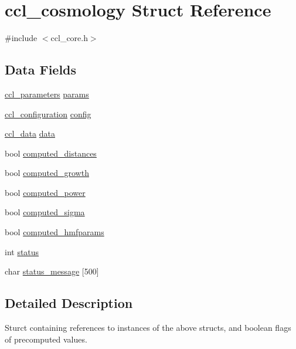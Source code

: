 \hypertarget{structccl__cosmology}{}\section{ccl\+\_\+cosmology Struct Reference}
\label{structccl__cosmology}


{\ttfamily \#include $<$ccl\+\_\+core.\+h$>$}

\subsection*{Data Fields}
\begin{DoxyCompactItemize}
\item 
\mbox{\hyperlink{structccl__parameters}{ccl\+\_\+parameters}} \mbox{\hyperlink{structccl__cosmology_ad58413720be45a206716254d9c1cc923}{params}}
\item 
\mbox{\hyperlink{structccl__configuration}{ccl\+\_\+configuration}} \mbox{\hyperlink{structccl__cosmology_a81c5ada17d334840105d2a29b76323fd}{config}}
\item 
\mbox{\hyperlink{structccl__data}{ccl\+\_\+data}} \mbox{\hyperlink{structccl__cosmology_a672d3fab40334e3a5da4324604715370}{data}}
\item 
bool \mbox{\hyperlink{structccl__cosmology_adb5cd3d53f2031a0716da22f45b4942f}{computed\+\_\+distances}}
\item 
bool \mbox{\hyperlink{structccl__cosmology_a4428497be74cf69ef0b4e8798d957e0b}{computed\+\_\+growth}}
\item 
bool \mbox{\hyperlink{structccl__cosmology_a6e67313352cef8c3ebd92dedd9913a2e}{computed\+\_\+power}}
\item 
bool \mbox{\hyperlink{structccl__cosmology_af2a13ba151996b6c144b7910c753597c}{computed\+\_\+sigma}}
\item 
bool \mbox{\hyperlink{structccl__cosmology_aad9340b8e85ae0f89ad3ac1136c590a7}{computed\+\_\+hmfparams}}
\item 
int \mbox{\hyperlink{structccl__cosmology_a6de30ecc78151cd63260547adc344e78}{status}}
\item 
char \mbox{\hyperlink{structccl__cosmology_ade6f0b525e23bd7c719a46fe0e083a5e}{status\+\_\+message}} \mbox{[}500\mbox{]}
\end{DoxyCompactItemize}


\subsection{Detailed Description}
Sturct containing references to instances of the above structs, and boolean flags of precomputed values. 

